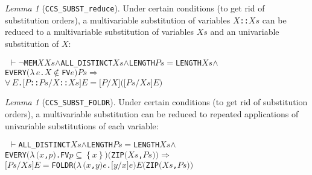 \documentclass[GCNS]{yincog}
\renewcommand{\HOLinline}[1]{\mbox{\textup{\texttt{#1}}}}
\renewcommand{\HOLConst}[1]{\texttt{#1}}
\renewcommand{\HOLBoundVar}[1]{\ensuremath{\mathit{#1}}}
\renewcommand{\HOLFreeVar}[1]{\ensuremath{\mathit{#1}}}
\renewcommand{\HOLSymConst}[1]{#1}
\renewcommand{\HOLTokenConj}{\ensuremath{\wedge}}
\renewcommand{\HOLTokenLeftbrace}{\ensuremath{\left \{\right .}}
\renewcommand{\HOLTokenRightbrace}{\ensuremath{\left .\right \}}}
\renewcommand{\HOLTokenNeg}{\ensuremath{\neg}}
\renewcommand{\HOLTokenSubset}{\ensuremath{\subseteq}}
\renewcommand{\HOLTokenForall}{\ensuremath{\forall \,}}
\renewcommand{\HOLTokenLambda}{\ensuremath{\lambda \,}}
\renewcommand{\HOLTokenNotIn}{\ensuremath{\notin}}
\renewcommand{\HOLTokenTurnstile}{\ensuremath{\:\:\vdash}}
\theoremstyle{remark}
\theoremstyle{theorem}
\newtheorem{lemma}[definition]{Lemma}
\theoremstyle{remark}
\renewcommand{\HOLTokenImp}{\ensuremath{\Longrightarrow}}
\newcommand{\univariate}{univariable\xspace}
\newcommand{\multivariate}{multivariable\xspace}
\begin{document}
\begin{lemma}[\texttt{CCS\_SUBST\_reduce}]
Under certain conditions (to get rid of substitution orders), a
\multivariate substitution of variables
\HOLinline{\HOLFreeVar{X}\HOLSymConst{::}\HOLFreeVar{Xs}} can be reduced
to a \multivariate substitution of variables
\HOLinline{\HOLFreeVar{Xs}} and an \univariate substitution of $X$:
%
\begin{alltt}
\HOLTokenTurnstile{} \HOLSymConst{\HOLTokenNeg{}}\HOLConst{MEM} \HOLFreeVar{X} \HOLFreeVar{Xs} \HOLSymConst{\HOLTokenConj{}} \HOLConst{ALL\_DISTINCT} \HOLFreeVar{Xs} \HOLSymConst{\HOLTokenConj{}} \HOLConst{LENGTH} \HOLFreeVar{Ps} \HOLSymConst{\ensuremath{=}} \HOLConst{LENGTH} \HOLFreeVar{Xs} \HOLSymConst{\HOLTokenConj{}}
   \HOLConst{EVERY} \ensuremath{(}\HOLTokenLambda{}\HOLBoundVar{e}. \HOLFreeVar{X} \HOLSymConst{\HOLTokenNotIn{}} \HOLConst{FV} \HOLBoundVar{e}\ensuremath{)} \HOLFreeVar{Ps} \HOLSymConst{\HOLTokenImp{}}
   \HOLSymConst{\HOLTokenForall{}}\HOLBoundVar{E}. \ensuremath{[}\HOLFreeVar{P}\HOLSymConst{::}\HOLFreeVar{Ps}\ensuremath{/}\HOLFreeVar{X}\HOLSymConst{::}\HOLFreeVar{Xs}\ensuremath{]} \HOLBoundVar{E} \HOLSymConst{\ensuremath{=}} \ensuremath{[}\HOLFreeVar{P}\ensuremath{/}\HOLFreeVar{X}\ensuremath{]} \ensuremath{(}\ensuremath{[}\HOLFreeVar{Ps}\ensuremath{/}\HOLFreeVar{Xs}\ensuremath{]} \HOLBoundVar{E}\ensuremath{)}
\end{alltt}
%
\end{lemma}

\begin{lemma}[\texttt{CCS\_SUBST\_FOLDR}]
Under certain conditions (to get rid of substitution orders), a
\multivariate substitution can be reduced to repeated applications of
\univariate substitutions of each variable:
%
\begin{alltt}
\HOLTokenTurnstile{} \HOLConst{ALL\_DISTINCT} \HOLFreeVar{Xs} \HOLSymConst{\HOLTokenConj{}} \HOLConst{LENGTH} \HOLFreeVar{Ps} \HOLSymConst{\ensuremath{=}} \HOLConst{LENGTH} \HOLFreeVar{Xs} \HOLSymConst{\HOLTokenConj{}}
   \HOLConst{EVERY} \ensuremath{(}\HOLTokenLambda{}\ensuremath{(}\HOLBoundVar{x}\HOLSymConst{,}\HOLBoundVar{p}\ensuremath{)}. \HOLConst{FV} \HOLBoundVar{p} \HOLSymConst{\HOLTokenSubset{}} \HOLTokenLeftbrace{}\HOLBoundVar{x}\HOLTokenRightbrace{}\ensuremath{)} \ensuremath{(}\HOLConst{ZIP} \ensuremath{(}\HOLFreeVar{Xs}\HOLSymConst{,}\HOLFreeVar{Ps}\ensuremath{)}\ensuremath{)} \HOLSymConst{\HOLTokenImp{}}
   \ensuremath{[}\HOLFreeVar{Ps}\ensuremath{/}\HOLFreeVar{Xs}\ensuremath{]} \HOLFreeVar{E} \HOLSymConst{\ensuremath{=}} \HOLConst{FOLDR} \ensuremath{(}\HOLTokenLambda{}\ensuremath{(}\HOLBoundVar{x}\HOLSymConst{,}\HOLBoundVar{y}\ensuremath{)} \HOLBoundVar{e}. \ensuremath{[}\HOLBoundVar{y}\ensuremath{/}\HOLBoundVar{x}\ensuremath{]} \HOLBoundVar{e}\ensuremath{)} \HOLFreeVar{E} \ensuremath{(}\HOLConst{ZIP} \ensuremath{(}\HOLFreeVar{Xs}\HOLSymConst{,}\HOLFreeVar{Ps}\ensuremath{)}\ensuremath{)}
\end{alltt}
%
\end{lemma}
\end{document}
